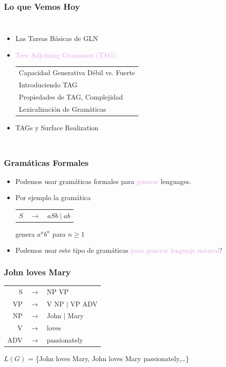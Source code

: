 \documentclass[compress,color=usenames]{beamer}
\newcommand{\mH}[1]{\textcolor{Plum}{#1}}
\begin{document}
\begin{frame}
\frametitle{Lo que Vemos Hoy}

\begin{columns}
\begin{itemize}
\item Las Tareas B\'asicas de GLN
\item \mH{Tree Adjoining Grammars (TAG)}
\begin{tabular}{|l}
Capacidad Generativa D\'ebil vs. Fuerte\\
Introduciendo TAG\\
Propiedades de TAG, Complejidad\\
Lexicalizaci\'on de Gram\'aticas
\end{tabular}

\item TAGs y Surface Realization
\end{itemize}
\end{columns}
\end{frame}

\begin{frame}
\frametitle{Gram\'aticas Formales}

\begin{itemize}
\item Podemos usar gram\'aticas formales para \mH{generar} lenguages.  
\item Por ejemplo la gram\'atica 
\begin{center}
\begin{tabular}{rcl}
$S$ & $\to$ & $aSb \mid ab$
\end{tabular}
\end{center}
genera $a^nb^n$ para $n\ge 1$
\item Podemos usar este tipo de gram\'aticas \mH{para generar lenguaje natural}?
\end{itemize}
\end{frame}

\begin{frame}
\frametitle{John loves Mary}

\begin{center}
\begin{tabular}{rcl}
  S & $\rightarrow$ & NP VP \\

 VP & $\rightarrow$ & V NP $\mid$ VP ADV  \\

 NP & $\rightarrow$ & John $\mid$ Mary  \\

  V & $\rightarrow$ & loves \\

ADV & $\rightarrow$ & passionately 
\end{tabular}
\end{center}


$L(G)$ = \{John loves Mary, John loves Mary passionately,\ldots\} 

\end{frame}
\end{document}
